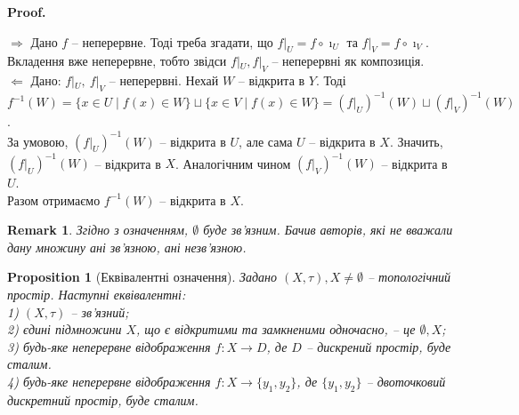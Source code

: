 \documentclass[a4paper, 10pt]{article}
\makeatletter
\def\rightproof{$\boxed{\Rightarrow}$ }
\def\leftproof{$\boxed{\Leftarrow}$ }
\theoremstyle{theoremdd}
\newtheorem{proposition}[theorem]{Proposition}
\newtheorem{remark}[theorem]{Remark}
\renewenvironment{proof}[1][Proof.\\]{\par
\pushQED{\hfill \qed}%
\normalfont \topsep6\p@\@plus6\p@\relax
\trivlist
\item\relax
{\bfseries
#1\@addpunct{.}}\hspace\labelsep\ignorespaces
}{%
\popQED\endtrivlist\@endpefalse
}
\makeatother
\begin{document}
\begin{proof}
\rightproof Дано $f$ -- неперервне. Тоді треба згадати, що $f|_U = f \circ \imath_U$ та $f|_V = f \circ \imath_V$. Вкладення вже неперервне, тобто звідси $f|_U, f|_V$ -- неперервні як композиція.
\bigskip \\
\leftproof Дано: $f|_U,\ f|_V$ -- неперервні. Нехай $W$ -- відкрита в $Y$. Тоді\\
$f^{-1}(W) = \{x \in U \mid f(x) \in W\} \sqcup \{x \in V \mid f(x) \in W\} = (f|_U)^{-1}(W) \sqcup (f|_V)^{-1}(W)$.\\
За умовою, $(f|_U)^{-1}(W)$ -- відкрита в $U$, але сама $U$ -- відкрита в $X$. Значить, $(f|_U)^{-1}(W)$ -- відкрита в $X$. Аналогічним чином $(f|_V)^{-1}(W)$ -- відкрита в $U$.\\
Разом отримаємо $f^{-1}(W)$ -- відкрита в $X$.
\end{proof}

\iffalse
\begin{remark}
Згідно з означенням, $\emptyset$ не є ані зв'язним, ані незв'язним. Хоча деякі вважають $\emptyset$ за зв'язним.
\end{remark}
\fi

\begin{remark}
Згідно з означенням, $\emptyset$ буде зв'язним. Бачив авторів, які не вважали дану множину ані зв'язною, ані незв'язною.
\end{remark}

\begin{proposition}[Еквівалентні означення]
Задано $(X,\tau), X \neq \emptyset$ -- топологічний простір. Наступні еквівалентні:\\
1) $(X,\tau)$ -- зв'язний;\\
2) єдині підмножини $X$, що є відкритими та замкненими одночасно, -- це $\emptyset, X$;\\
3) будь-яке неперервне відображення $f \colon X \to D$, де $D$ -- дискрений простір, буде сталим.\\
4) будь-яке неперервне відображення $f \colon X \to \{y_1,y_2\}$, де $\{y_1,y_2\}$ -- двоточковий дискретний простір, буде сталим.
\end{proposition}
\end{document}
